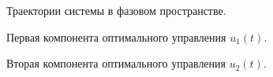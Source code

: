 \documentclass[10pt]{article}
\begin{document}
\begin{figure}[h]
	\caption*{Траектории системы в фазовом пространстве.}
\end{figure}
\begin{figure}[h]
	\caption*{Первая компонента оптимального управления \( u_1(t) \).}
\end{figure}
\newpage
\begin{figure}[h]
	\caption*{Вторая компонента оптимального управления \( u_2(t) \).}
\end{figure}
\end{document}
